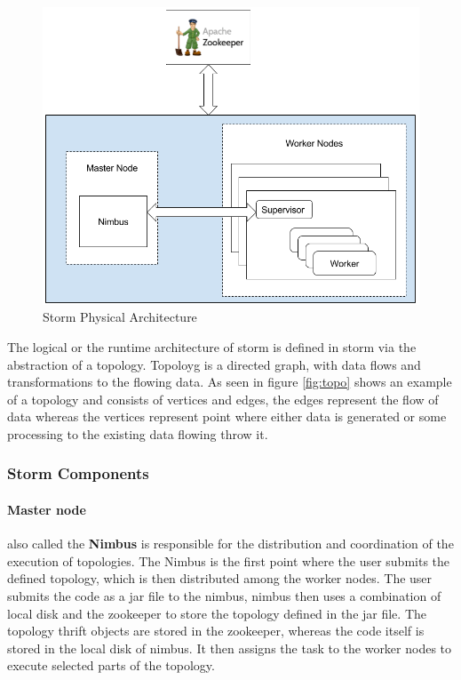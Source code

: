 \documentclass[runningheads,a4paper]{llncs}[2015/06/24]
\begin{document}
\begin{figure}
  \begin{center}
    \includegraphics[width=.7\textwidth]{arch.png}
    \caption{Storm Physical Architecture}
    \label{fig:physicalarc}
   \end{center}
\end{figure}

The logical or the runtime architecture of storm is defined in storm via the abstraction of a topology. Topoloyg is a directed graph, with data flows and transformations to the flowing data. As seen in figure \ref{fig:topo} shows an example of a topology and consists of vertices and edges, the edges represent the flow of data whereas the vertices represent point where either data is generated or some processing to the existing data flowing throw it.

\subsubsection{Storm Components}
\paragraph{Master node} also called the \textbf{Nimbus} is responsible for the distribution and coordination of the execution of topologies. The Nimbus is the first point where the user submits the defined topology, which is then distributed among the worker nodes. The user submits the code as a jar file to the nimbus, nimbus then uses a combination of local disk and the zookeeper to store the topology defined in the jar file.\cite{stormtwitter} The topology thrift objects are stored in the zookeeper, whereas the code itself is stored in the local disk of nimbus. It then assigns the task to the worker nodes to execute selected parts of the topology.
\end{document}
